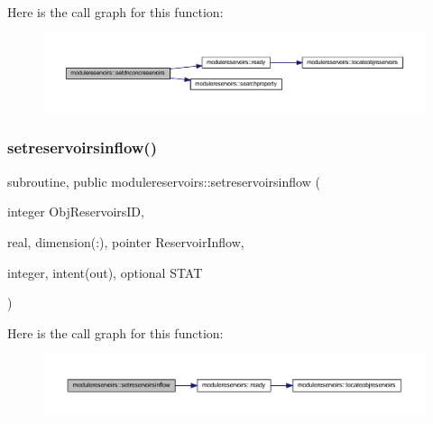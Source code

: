 Here is the call graph for this function\+:\nopagebreak
\begin{figure}[H]
\begin{center}
\leavevmode
\includegraphics[width=350pt]{namespacemodulereservoirs_a947f8bf80536f49287e59c0f5d008f17_cgraph}
\end{center}
\end{figure}
\mbox{\label{namespacemodulereservoirs_af7840621e7e8765fc75f7a8c81f0b054}} 
\subsubsection{\texorpdfstring{setreservoirsinflow()}{setreservoirsinflow()}}
{\footnotesize\ttfamily subroutine, public modulereservoirs\+::setreservoirsinflow (\begin{DoxyParamCaption}\item[{integer}]{Obj\+Reservoirs\+ID,  }\item[{real, dimension(\+:), pointer}]{Reservoir\+Inflow,  }\item[{integer, intent(out), optional}]{S\+T\+AT }\end{DoxyParamCaption})}

Here is the call graph for this function\+:\nopagebreak
\begin{figure}[H]
\begin{center}
\leavevmode
\includegraphics[width=350pt]{namespacemodulereservoirs_af7840621e7e8765fc75f7a8c81f0b054_cgraph}
\end{center}
\end{figure}
\mbox{\label{namespacemodulereservoirs_aef049b96a145e57423b0b2da90a0a934}} 
